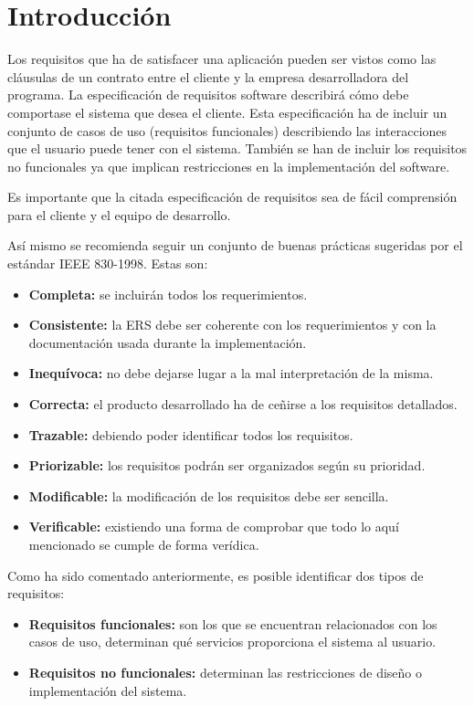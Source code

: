 
\section{Introducción}

Los requisitos que ha de satisfacer una aplicación pueden ser vistos como las cláusulas de un contrato entre el cliente y la empresa desarrolladora del programa. La especificación de requisitos software describirá cómo debe comportase el sistema que desea el cliente. Esta especificación ha de incluir un conjunto de casos de uso (requisitos funcionales) describiendo las interacciones que el usuario puede tener con el sistema. También se han de incluir los requisitos no funcionales ya que implican restricciones en la implementación del software.

Es importante que la citada especificación de requisitos sea de fácil comprensión para el cliente y el equipo de desarrollo.

Así mismo se recomienda seguir un conjunto de buenas prácticas sugeridas por el estándar IEEE 830-1998. Estas son:

\begin{itemize}
	\item \textbf{Completa:} se incluirán todos los requerimientos.
	\item \textbf{Consistente:} la ERS debe ser coherente con los requerimientos y con la documentación usada durante la implementación.
	\item \textbf{Inequívoca:} no debe dejarse lugar a la mal interpretación de la misma.
	\item \textbf{Correcta:} el producto desarrollado ha de ceñirse a los requisitos detallados.
	\item \textbf{Trazable:} debiendo poder identificar todos los requisitos.
	\item \textbf{Priorizable:} los requisitos podrán ser organizados según su prioridad.
	\item \textbf{Modificable:} la modificación de los requisitos debe ser sencilla. 
	\item \textbf{Verificable:} existiendo una forma de comprobar que todo lo aquí mencionado se cumple de forma verídica.
\end{itemize}

Como ha sido comentado anteriormente, es posible identificar dos tipos de requisitos:

\begin{itemize}
	\item \textbf{Requisitos funcionales:} son los que se encuentran relacionados con los casos de uso, determinan qué servicios proporciona el sistema al usuario.
	\item \textbf{Requisitos no funcionales:} determinan las restricciones de diseño o implementación del sistema.
\end{itemize}


